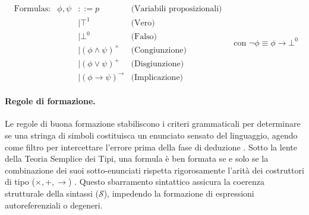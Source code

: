 \begin{equation}
    \begin{array}{lrll}
        \text{Formulas:} & \phi, \psi & ::= p \quad                     & \text{(Variabili proposizionali)} \\
                         &            & \mid \top^1 \quad               & \text{(Vero)}                     \\
                         &            & \mid \bot^0 \quad               & \text{(Falso)}                    \\
                         &            & \mid (\phi \land \psi)^{\times} & \text{(Congiunzione)}             \\
                         &            & \mid (\phi \lor \psi)^{+}       & \text{(Disgiunzione)}             \\
                         &            & \mid (\phi \to \psi)^{\to}      & \text{(Implicazione)}
    \end{array}
    \quad \text{con } \neg \phi \equiv \phi \to \bot^0
    \tag{IPC}
    \label{eq:ipc_grammar}
\end{equation}

\paragraph{Regole di formazione.}
Le regole di buona formazione stabiliscono i criteri grammaticali per determinare se una stringa di simboli costituisca un enunciato sensato del linguaggio, agendo come filtro per intercettare l'errore prima della fase di deduzione \cite{hindley1997}. 
Sotto la lente della Teoria Semplice dei Tipi, una formula è ben formata se e solo se la combinazione dei suoi sotto-enunciati rispetta rigorosamente l'arità dei costruttori di tipo ($\times, +, \to$) \cite{hindley1997}. Questo sbarramento sintattico 
assicura la coerenza strutturale della sintassi ($\mathcal{S}$), impedendo la formazione di espressioni autoreferenziali o degeneri.